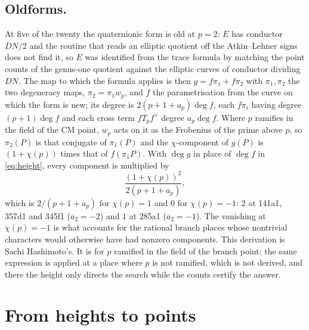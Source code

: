 \documentclass[11pt,reqno]{amsart}
\theoremstyle{plain}
\theoremstyle{definition}
\begin{document}
\subsection*{Oldforms.}
At five of the twenty the quaternionic form is old at $p=2$: $E$ has conductor $DN/2$ and the
routine that reads an elliptic quotient off the Atkin--Lehner signs does not find it, so $E$ was
identified from the trace formula by matching the point counts of the genus-one quotient against
the elliptic curves of conductor dividing $DN$. The map to which the formula applies is then
$g=f\pi_1+f\pi_2$ with $\pi_1,\pi_2$ the two degeneracy maps, $\pi_2=\pi_1w_p$, and $f$ the
parametrisation from the curve on which the form is new; its degree is $2(p+1+a_p)\deg f$, each
$f\pi_i$ having degree $(p+1)\deg f$ and each cross term $fT_pf^\vee$ degree $a_p\deg f$. Where $p$
ramifies in the field of the CM point, $w_p$ acts on it as the Frobenius of the prime above $p$,
so $\pi_2(P)$ is that conjugate of $\pi_1(P)$ and the $\chi$-component of $g(P)$ is $(1+\chi(p))$
times that of $f(\pi_1P)$. With $\deg g$ in place of $\deg f$ in \eqref{eq:height}, every
component is multiplied by
\[
  \frac{(1+\chi(p))^2}{2(p+1+a_p)},
\]
which is $2/(p+1+a_p)$ for $\chi(p)=1$ and $0$ for $\chi(p)=-1$: $2$ at 141a1, 357d1 and 345f1
($a_2=-2$) and $1$ at 285a1 ($a_2=-1$). The vanishing at $\chi(p)=-1$ is what accounts for the
rational branch places whose nontrivial characters would otherwise have had nonzero components.
This derivation is Sachi Hashimoto's. It is for $p$ ramified in the field of the branch point; the
same expression is applied at a place where $p$ is not ramified, which is not derived, and there
the height only directs the search while the counts certify the answer.

\section{From heights to points}\label{sec:points}
\end{document}
